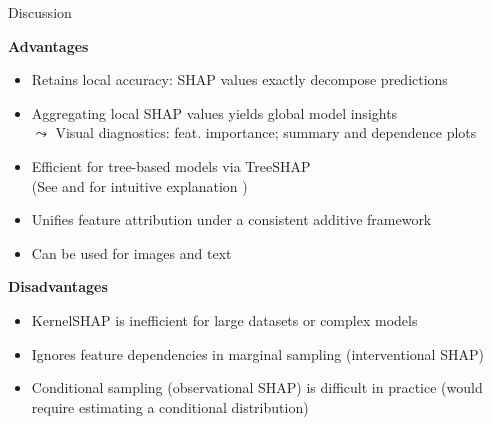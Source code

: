 \documentclass[10pt,compress,t,notes=noshow, xcolor=table]{beamer}
\begin{document}
\begin{frame}{Discussion}

\textbf{Advantages}

\begin{itemize}
    \item Retains local accuracy: SHAP values exactly decompose predictions
    \item Aggregating local SHAP values yields global model insights\\
    $\leadsto$ Visual diagnostics: feat. importance; summary and dependence plots
    \item Efficient for tree-based models via TreeSHAP\\
    (See  and for intuitive explanation )
    \item Unifies feature attribution under a consistent additive framework
    
    \item Can be used for images   and text 
\end{itemize}

\medskip

\textbf{Disadvantages}

\begin{itemize}
  \item KernelSHAP is inefficient for large datasets or complex models
   \item Ignores feature dependencies in marginal sampling (interventional SHAP)
   \item Conditional sampling (observational SHAP) is difficult in practice (would require estimating a conditional distribution)
 
\end{itemize}


\end{frame}

\endlecture
\end{document}
